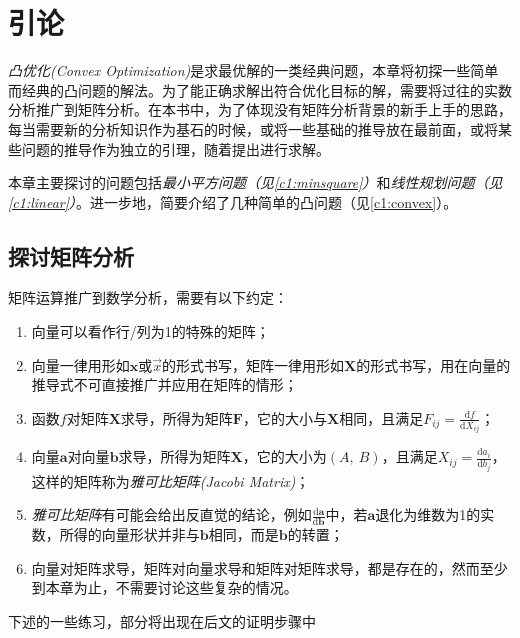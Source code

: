 \chapter{引论}

\emph{凸优化(Convex Optimization)}是求最优解的一类经典问题，本章将初探一些简单而经典的凸问题的解法。为了能正确求解出符合优化目标的解，需要将过往的实数分析推广到矩阵分析。在本书中，为了体现没有矩阵分析背景的新手上手的思路，每当需要新的分析知识作为基石的时候，或将一些基础的推导放在最前面，或将某些问题的推导作为独立的引理，随着提出进行求解。

本章主要探讨的问题包括\emph{最小平方问题（见\autoref{c1:minsquare}）}和\emph{线性规划问题（见\autoref{c1:linear}）}。进一步地，简要介绍了几种简单的凸问题（见\autoref{c1:convex}）。

\section{探讨矩阵分析}
    矩阵运算推广到数学分析，需要有以下约定：
    
    \begin{enumerate}[label=(\arabic*)]
    	\item 向量可以看作行/列为1的特殊的矩阵；
    	\item 向量一律用形如$\mathbf{x}$或$\vec{x}$的形式书写，矩阵一律用形如$\mathbf{X}$的形式书写，用在向量的推导式不可直接推广并应用在矩阵的情形；
    	\item 函数$f$对矩阵$\mathbf{X}$求导，所得为矩阵$\mathbf{F}$，它的大小与$\mathbf{X}$相同，且满足$F_{ij}=\frac{\mathrm{d}f}{\mathrm{d}X_{ij}}$；
    	\item 向量$\mathbf{a}$对向量$\mathbf{b}$求导，所得为矩阵$\mathbf{X}$，它的大小为$(A,~B)$，且满足$X_{ij}=\frac{\mathrm{d}a_i}{\mathrm{d}b_{j}}$，这样的矩阵称为\emph{雅可比矩阵(Jacobi Matrix)}；
    	\item \emph{雅可比矩阵}有可能会给出反直觉的结论，例如$\frac{\mathrm{d}\mathbf{a}}{\mathrm{d}\mathbf{b}}$中，若$\mathbf{a}$退化为维数为1的实数，所得的向量形状并非与$\mathbf{b}$相同，而是$\mathbf{b}$的转置；
    	\item 向量对矩阵求导，矩阵对向量求导和矩阵对矩阵求导，都是存在的，然而至少到本章为止，不需要讨论这些复杂的情况。
    \end{enumerate}

	下述的一些练习，部分将出现在后文的证明步骤中
	
